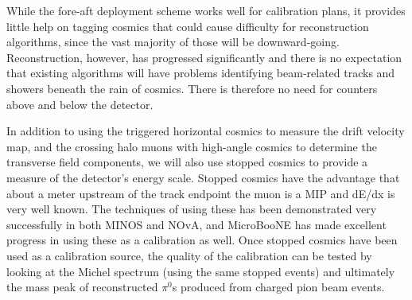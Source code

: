  While the fore-aft deployment scheme works well for calibration plans,
it provides little help on tagging cosmics that could cause difficulty for
reconstruction algorithms, since the vast majority of those will be
downward-going.  Reconstruction, however, has progressed significantly and
there is no expectation that existing algorithms will have problems identifying
beam-related tracks and showers beneath the rain of cosmics. There is therefore
no need for counters above and below the detector.

        In addition to using the triggered horizontal cosmics to measure the
drift velocity map, and the crossing halo muons with high-angle cosmics to
determine the transverse field components, we will also use stopped cosmics to
provide a measure of the detector's energy scale. Stopped cosmics have the
advantage that about a meter upstream of the track endpoint the muon is a MIP
and dE/dx is very well known. The techniques of using these has been
demonstrated very successfully in both MINOS and NOvA, and MicroBooNE has made
excellent progress in using these as a calibration as well. Once stopped cosmics have been 
used as a calibration source, the quality of the calibration can be tested by looking at the Michel
spectrum (using the same stopped events) and ultimately the mass peak of
reconstructed $\pi^0$s produced from charged pion beam events.



